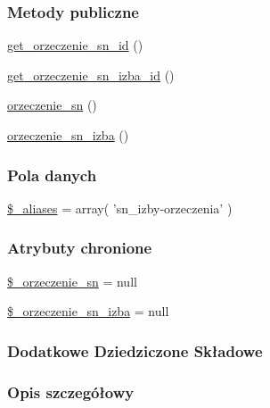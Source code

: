 \subsubsection*{Metody publiczne}
\begin{DoxyCompactItemize}
\item 
\hyperlink{classep___s_n___orzeczenie___izba_a48819f0e56cb11707ba89150dd449c71}{get\-\_\-orzeczenie\-\_\-sn\-\_\-id} ()
\item 
\hyperlink{classep___s_n___orzeczenie___izba_aba2800f3b6be0f0951a8b061b0019ea7}{get\-\_\-orzeczenie\-\_\-sn\-\_\-izba\-\_\-id} ()
\item 
\hyperlink{classep___s_n___orzeczenie___izba_ad3ca9a024234af7b90b52e8edb3406ff}{orzeczenie\-\_\-sn} ()
\item 
\hyperlink{classep___s_n___orzeczenie___izba_ad33bb7ef5f99e5950c5994a501361b1c}{orzeczenie\-\_\-sn\-\_\-izba} ()
\end{DoxyCompactItemize}
\subsubsection*{Pola danych}
\begin{DoxyCompactItemize}
\item 
\hyperlink{classep___s_n___orzeczenie___izba_ab4e31d75f0bc5d512456911e5d01366b}{\$\-\_\-aliases} = array( 'sn\-\_\-izby-\/orzeczenia' )
\end{DoxyCompactItemize}
\subsubsection*{Atrybuty chronione}
\begin{DoxyCompactItemize}
\item 
\hyperlink{classep___s_n___orzeczenie___izba_a03da9aa4f10fbe1d2b4ef32521cbedb0}{\$\-\_\-orzeczenie\-\_\-sn} = null
\item 
\hyperlink{classep___s_n___orzeczenie___izba_a03bb0e40e6b5ea8dc5d273a501e27211}{\$\-\_\-orzeczenie\-\_\-sn\-\_\-izba} = null
\end{DoxyCompactItemize}
\subsubsection*{Dodatkowe Dziedziczone Składowe}


\subsubsection{Opis szczegółowy}


